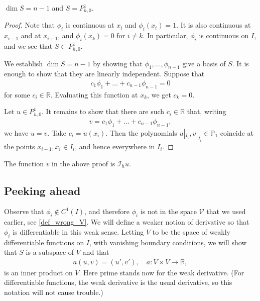 \documentclass[12pt,oneside,final]{amsart}
\def\R{\mathbb R}
\def\I{\mathcal I}
\begin{document}
\begin{lemma}
$\dim S = n-1$ and $S = P^1_{h,0}$.
\end{lemma}
\begin{proof}
Note that $\phi_i$ is continuous at $x_i$ and $\phi_i(x_i) = 1$.
It is also continuous at $x_{i-1}$ and at $x_{i+1}$,
and $\phi_i(x_k) = 0$ for $i \ne k$. In particular, $\phi_i$ is continuous on $I$, and we see that $S \subset P_{h,0}^1$.

We establish $\dim S = n - 1$ by showing that $\phi_1,\dots,\phi_{n-1}$ give a basis of $S$.
It is enough to show that they are linearly independent.
Suppose that 
    \begin{align*}
c_1 \phi_1 + \dots + c_{n-1} \phi_{n-1} = 0
    \end{align*}
for some $c_i \in \R$. Evaluating this function at $x_k$, we get 
$c_k = 0$.

Let $u \in P^1_{h,0}$. It remains to show that there are such $c_i \in \R$ that, writing
    \begin{align*}
v = c_1 \phi_1 + \dots + c_{n-1} \phi_{n-1},
    \end{align*}
we have $u = v$. 
Take $c_i = u(x_i)$. Then 
the polynomials
$u|_{I_i}, v|_{I_i} \in \mathbb P_1$ 
coincide at the points $x_{i-1}, x_i \in I_i$, and hence everywhere in $I_i$.
\end{proof}

\begin{remark}\label{rem_Ih}
The function $v$ in the above proof is $\I_h u$.
\end{remark}

\subsection{Peeking ahead\label{sec_peek}}

Observe that $\phi_i \notin C^1(I)$, and therefore $\phi_i$ is not in the space $\mathcal V$
that we used earlier, see \eqref{def_wrong_V}. We will define a weaker notion of derivative so that $\phi_i$ is differentiable in this weak sense. Letting $V$ to be the space of weakly differentiable functions on $I$, with vanishing boundary conditions, 
we will show that $S$ is a subspace of $V$ and that 
    \begin{align*}
a(u, v) = (u', v'), \quad a : V \times V \to \mathbb R,
    \end{align*}
is an inner product on $V$. Here prime stands now for the weak derivative. (For differentiable functions, the weak derivative is the usual derivative, so this notation will not cause trouble.)
\end{document}
